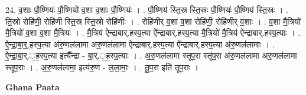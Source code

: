 \documentclass[17pt]{extarticle}
\begin{document}
24. व॒शाः पौ॒ष्णियः॑ पौ॒ष्णियो॑ व॒शा व॒शाः पौ॒ष्णियः॑ । . पौ॒ष्णिय॑ स्ति॒स्र स्ति॒स्रः पौ॒ष्णियः॑ पौ॒ष्णिय॑ स्ति॒स्रः । . ति॒स्रो रोहि॑णी॒ रोहि॑णी स्ति॒स्र स्ति॒स्रो रोहि॑णीः । . रोहि॑णीर् व॒शा व॒शा रोहि॑णी॒ रोहि॑णीर् व॒शाः । . व॒शा मै॒त्रियो॑ मै॒त्रियो॑ व॒शा व॒शा मै॒त्रियः॑ । . मै॒त्रिय॑ ऐन्द्राबार्.हस्प॒त्या ऐ᳚न्द्राबार्.हस्प॒त्या मै॒त्रियो॑ मै॒त्रिय॑ ऐन्द्राबार्.हस्प॒त्याः । . ऐ॒न्द्रा॒बा॒र्॒.ह॒स्प॒त्या अ॑रु॒णल॑लामा अरु॒णल॑लामा ऐन्द्राबार्.हस्प॒त्या ऐ᳚न्द्राबार्.हस्प॒त्या अ॑रु॒णल॑लामाः । . ऐ॒न्द्रा॒बा॒र्.॒ह॒स्प॒त्या इत्यै᳚न्द्रा - बा॒र्.॒ह॒स्प॒त्याः । . अ॒रु॒णल॑लामा स्तूप॒रा स्तू॑प॒रा अ॑रु॒णल॑लामा अरु॒णल॑लामा स्तूप॒राः । . अ॒रु॒णल॑लामा॒ इत्य॑रु॒ण - ल॒ला॒माः॒ । . तू॒प॒रा इति॑ तूप॒राः । \newline

\textbf{Ghana Paata } \newline
\end{document}
